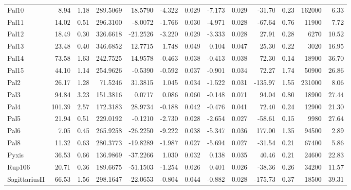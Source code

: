 \begin{longtable}{ | l | r | r| r | r | r | r | r | r | r | r | r | r  |}
            Pal10         &   8.94 & 1.18 & 289.5069 &  18.5790 &  -4.322 & 0.029 &  -7.173 &  0.029 &  -31.70 &  0.23 &  162000 &  6.33\\ 
            Pal11         &  14.02 & 0.51 & 296.3100 &  -8.0072 &  -1.766 & 0.030 &  -4.971 &  0.028 &  -67.64 &  0.76 &   11900 &  7.72\\ 
            Pal12         &  18.49 & 0.30 & 326.6618 & -21.2526 &  -3.220 & 0.029 &  -3.333 &  0.028 &   27.91 &  0.28 &    6270 & 10.52\\ 
            Pal13         &  23.48 & 0.40 & 346.6852 &  12.7715 &   1.748 & 0.049 &   0.104 &  0.047 &   25.30 &  0.22 &    3020 & 16.95\\ 
            Pal14         &  73.58 & 1.63 & 242.7525 &  14.9578 &  -0.463 & 0.038 &  -0.413 &  0.038 &   72.30 &  0.14 &   18900 & 36.70\\ 
            Pal15         &  44.10 & 1.14 & 254.9626 &  -0.5390 &  -0.592 & 0.037 &  -0.901 &  0.034 &   72.27 &  1.74 &   50900 & 26.86\\ 
            Pal2          &  26.17 & 1.28 &  71.5246 &  31.3815 &   1.045 & 0.034 &  -1.522 &  0.031 & -135.97 &  1.55 &  231000 &  8.06\\ 
            Pal3          &  94.84 & 3.23 & 151.3816 &   0.0717 &   0.086 & 0.060 &  -0.148 &  0.071 &   94.04 &  0.80 &   18900 & 27.44\\ 
            Pal4          & 101.39 & 2.57 & 172.3183 &  28.9734 &  -0.188 & 0.042 &  -0.476 &  0.041 &   72.40 &  0.24 &   12900 & 21.30\\ 
            Pal5          &  21.94 & 0.51 & 229.0192 &  -0.1210 &  -2.730 & 0.028 &  -2.654 &  0.027 &  -58.61 &  0.15 &    9980 & 27.64\\ 
            Pal6          &   7.05 & 0.45 & 265.9258 & -26.2250 &  -9.222 & 0.038 &  -5.347 &  0.036 &  177.00 &  1.35 &   94500 &  2.89\\ 
            Pal8          &  11.32 & 0.63 & 280.3773 & -19.8289 &  -1.987 & 0.027 &  -5.694 &  0.027 &  -31.54 &  0.21 &   67400 &  5.86\\ 
            Pyxis         &  36.53 & 0.66 & 136.9869 & -37.2266 &   1.030 & 0.032 &   0.138 &  0.035 &   40.46 &  0.21 &   24600 & 22.83\\ 
            Rup106        &  20.71 & 0.36 & 189.6675 & -51.1503 &  -1.254 & 0.026 &   0.401 &  0.026 &  -38.36 &  0.26 &   34200 & 11.57\\ 
            SagittariusII &  66.53 & 1.56 & 298.1647 & -22.0653 &  -0.804 & 0.044 &  -0.882 &  0.028 & -175.73 &  0.37 &   18500 & 39.31\\ 

\end{longtable}

